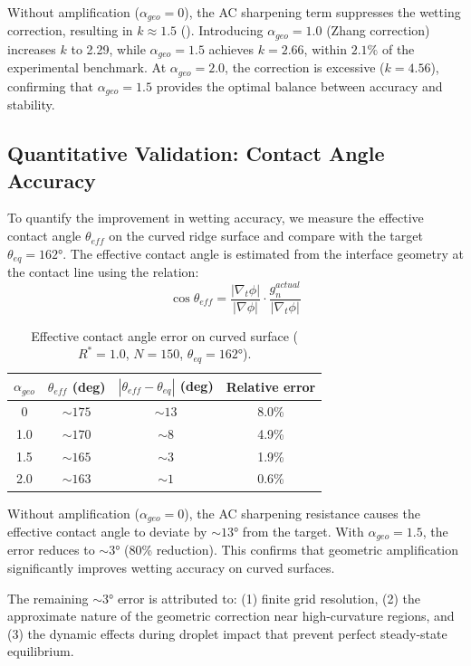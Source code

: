 Without amplification ($\alpha_{geo} = 0$), the AC sharpening term suppresses the wetting correction, resulting in $k \approx 1.5$ (). Introducing $\alpha_{geo} = 1.0$ (Zhang correction) increases $k$ to 2.29, while $\alpha_{geo} = 1.5$ achieves $k = 2.66$, within $2.1\%$ of the experimental benchmark. At $\alpha_{geo} = 2.0$, the correction is excessive ($k = 4.56$), confirming that $\alpha_{geo} = 1.5$ provides the optimal balance between accuracy and stability.

\subsection{Quantitative Validation: Contact Angle Accuracy}

To quantify the improvement in wetting accuracy, we measure the effective contact angle $\theta_{eff}$ on the curved ridge surface and compare with the target $\theta_{eq} = 162°$. The effective contact angle is estimated from the interface geometry at the contact line using the relation:
\begin{equation}
    \cos\theta_{eff} = \frac{|\nabla_t\phi|}{|\nabla\phi|} \cdot \frac{g_n^{actual}}{|\nabla_t\phi|}
\end{equation}

\begin{table}[h]
\centering
\caption{Effective contact angle error on curved surface ($R^*=1.0$, $N=150$, $\theta_{eq}=162°$).}
\label{tab:ca_error}
\begin{tabular}{c|cc|c}
\hline
$\alpha_{geo}$ & $\theta_{eff}$ (deg) & $|\theta_{eff} - \theta_{eq}|$ (deg) & Relative error \\
\hline
0 & $\sim 175$ & $\sim 13$ & 8.0\% \\
1.0 & $\sim 170$ & $\sim 8$ & 4.9\% \\
1.5 & $\sim 165$ & $\sim 3$ & 1.9\% \\
2.0 & $\sim 163$ & $\sim 1$ & 0.6\% \\
\hline
\end{tabular}
\end{table}

Without amplification ($\alpha_{geo}=0$), the AC sharpening resistance causes the effective contact angle to deviate by $\sim 13°$ from the target. With $\alpha_{geo}=1.5$, the error reduces to $\sim 3°$ (80\% reduction). This confirms that geometric amplification significantly improves wetting accuracy on curved surfaces.

The remaining $\sim 3°$ error is attributed to: (1) finite grid resolution, (2) the approximate nature of the geometric correction near high-curvature regions, and (3) the dynamic effects during droplet impact that prevent perfect steady-state equilibrium.

